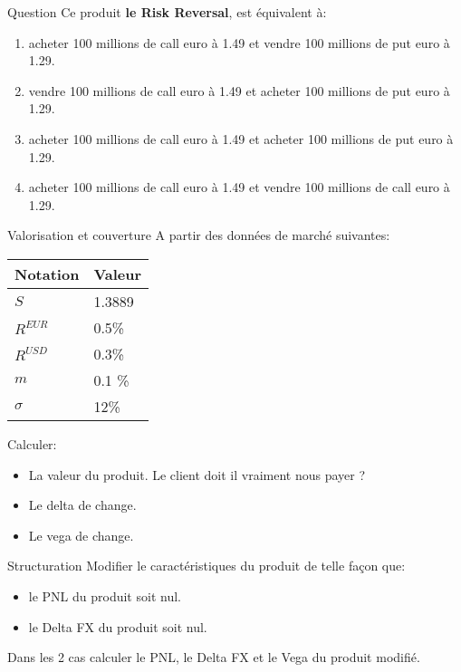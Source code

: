 \documentclass{beamer}
\begin{document}
\begin{frame}{Question}
Ce produit \textbf{le Risk Reversal}, est équivalent à:\\
\vspace{0.5cm}
\begin{enumerate}
\item acheter 100 millions de call euro à 1.49 et vendre 100 millions de put euro à 1.29.
\item vendre 100 millions de call euro à 1.49 et acheter 100 millions de put euro à 1.29.
\item acheter 100 millions de call euro à 1.49 et acheter 100 millions de put euro à 1.29.
\item acheter 100 millions de call euro à 1.49 et vendre 100 millions de call euro à 1.29.
\end{enumerate}

\end{frame}

\begin{frame}{Valorisation et couverture}
A partir des données de marché suivantes:\\
\begin{center}
\begin{tabular}{|l|l|}
\hline
\textbf{Notation} & \textbf{Valeur} \\
\hline
\hline
$S$ & 1.3889 \\
$R^{EUR}$ & 0.5\% \\
$R^{USD}$ & 0.3\% \\
$m$ & 0.1 \% \\
$\sigma$ & 12\% \\
\hline
\end{tabular}
\end{center}
Calculer:
\begin{itemize}
\item La valeur du produit. Le client doit il vraiment nous payer ?\\
\item Le delta de change. \\
\item Le vega de change. \\ 
\end{itemize}
\end{frame}

\begin{frame}{Structuration}
Modifier le caractéristiques du produit de telle façon que:\\
\begin{itemize}
\item le PNL du produit soit nul.
\item le Delta FX du produit soit nul.
\end{itemize}
\vspace{0.5cm}
Dans les 2 cas calculer le PNL, le Delta FX et le Vega du produit modifié.
\end{frame}
\end{document}
